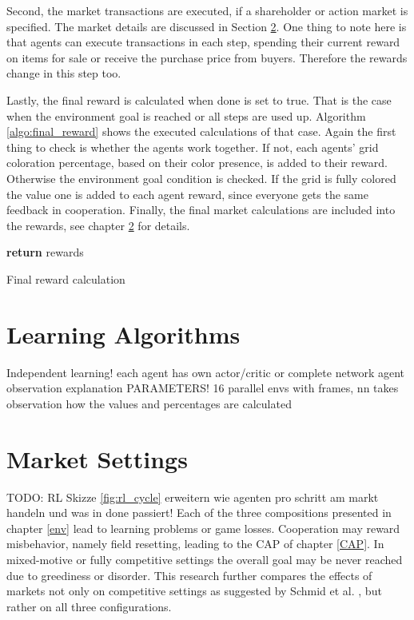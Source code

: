 Second, the market transactions are executed, if a shareholder or action market is specified. The market details are discussed in Section \ref{market_settings}. One thing to note here is that agents can execute transactions in each step, spending their current reward on items for sale or receive the purchase price from buyers. Therefore the rewards change in this step too.

Lastly, the final reward is calculated when done is set to true. That is the case when the environment goal is reached or all steps are used up. Algorithm \ref{algo:final_reward} shows the executed calculations of that case. Again the first thing to check is whether the agents work together. If not, each agents' grid coloration percentage, based on their color presence, is added to their reward. Otherwise the environment goal condition is checked. If the grid is fully colored the value one is added to each agent reward, since everyone gets the same feedback in cooperation. Finally, the final market calculations are included into the rewards, see chapter \ref{market_settings} for details.

\begin{algorithm}[H]
    \DontPrintSemicolon
    \textbf{return} rewards\;
    \caption{Final reward calculation}\label{algo:final_reward}
\end{algorithm}


\section{Learning Algorithms}\label{learning_algos}
Independent learning! each agent has own actor/critic or complete network
agent observation explanation
PARAMETERS!
16 parallel envs with frames,
nn takes observation
how the values and percentages are calculated

\section{Market Settings}\label{market_settings} %
TODO: RL Skizze \ref{fig:rl_cycle} erweitern wie agenten pro schritt am markt handeln und was in done passiert!
Each of the three compositions presented in chapter \ref{env} lead to learning problems or game losses. Cooperation may reward misbehavior, namely field resetting, leading to the CAP of chapter \ref{CAP}. In mixed-motive or fully competitive settings the overall goal may be never reached due to greediness or disorder. This research further compares the effects of markets not only on competitive settings as suggested by Schmid et al. \cite{scbe21}, but rather on all three configurations.

